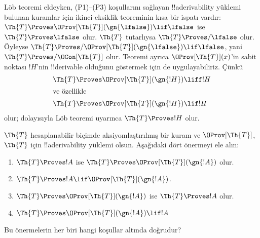 L\"ob teoremi eldeyken, (P1)--(P3) koşullarını sağlayan !!a{derivability}
yüklemi bulunan kuramlar için ikinci eksiklik teoreminin kısa bir ispatı
vardır: $\Th{T} \Proves \OProv[\Th{T}](\gn{\lfalse}) \lif \lfalse$ ise
$\Th{T} \Proves \lfalse$ olur. $\Th{T}$ tutarlıysa
$\Th{T} \Proves/ \lfalse$ olur. Öyleyse
$\Th{T} \Proves/ \OProv[\Th{T}](\gn{\lfalse}) \lif \lfalse$, yani
$\Th{T} \Proves/ \OCon[\Th{T}]$ olur. Teoremi ayrıca
$\OProv[\Th{T}](x)$'in sabit noktası $!H$'nin !!{derivable} olduğunu göstermek
için de uygulayabiliriz. Çünkü
\begin{align*}
  \Th{T} & \Proves \OProv[\Th{T}](\gn{!H}) \liff !H\\
  \intertext{ve özellikle}
    \Th{T} & \Proves \OProv[\Th{T}](\gn{!H}) \lif !H
\end{align*}
olur; dolayısıyla L\"ob teoremi uyarınca $\Th{T} \Proves !H$ olur.


\begin{prob}
$\Th{T}$ hesaplanabilir biçimde aksiyomlaştırılmış bir kuram ve
$\OProv[\Th{T}]$, $\Th{T}$ için !!a{derivability} yüklemi olsun. Aşağıdaki
dört önermeyi ele alın:
\begin{enumerate}
\item $\Th{T} \Proves !A$ ise $\Th{T} \Proves \OProv[\Th{T}](\gn{!A})$ olur.
\item $\Th{T} \Proves !A \lif \OProv[\Th{T}](\gn{!A})$.
\item $\Th{T} \Proves \OProv[\Th{T}](\gn{!A})$ ise $\Th{T} \Proves !A$ olur.
\item $\Th{T} \Proves \OProv[\Th{T}](\gn{!A}) \lif !A$
\end{enumerate}
Bu önermelerin her biri hangi koşullar altında doğrudur?
\end{prob}

